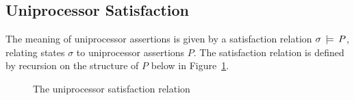 \documentclass[11pt]{report}
\begin{document}
\subsection{Uniprocessor Satisfaction}
\label{sec:uniprocessor-satisfaction}

The meaning of uniprocessor assertions is given by a satisfaction relation $\sigma \,\models\, P$, relating states $\sigma$ to uniprocessor assertions $P$. The satisfaction relation is defined by recursion on the structure of $P$ below in Figure~\ref{fig:uniprocessor-satisfaction-relation}. 

\begin{figure}[ht]
    \centering
    \resizebox{\columnwidth}{!}{
    \begin{minipage}{\columnwidth}
    \[
    \begin{array}{lllll}
        (s,h,b) & \sentails & b & \iffdef & \ext{s}(b) = 1 \\
        (s,h,b) & \sentails & {P \disj Q} & \iffdef & (s,h,b) \sentails{P} \disj (s,h,b) \sentails{Q} \\
        (s,h,b) & \sentails & {P \conj Q} & \iffdef & (s,h,b) \sentails{P} \conj (s,h,b) \sentails{Q} \\
        (s,h,b) & \sentails & {\exists x \st P} & \iffdef & \exists v \in \setvalues \st (\funup{s}{\ptup{x}{v}},h,b) \sentails{P} \\
        (s,h,b) & \sentails & {\forall x \st P} & \iffdef & \forall v \in \setvalues \st (\funup{s}{\ptup{x}{v}},h,b) \sentails{P} \\
        (s,h,b) & \sentails & {\femp} & \iffdef & h = \nil \conj b = \lnil \\
        (s,h,b) & \sentails & \fbaru & \iffdef & b = \lnil \\ 
        (s,h,b) & \sentails & {e \fwriteu e'} & \iffdef & ((h = \nil \conj b = \llit{(\ext{s}(e),\ext{s}(e''))}) \disj \\ 
        & & & & \,\;(h = \ext{s}(e) \mapsto \ext{s}(e') \conj b = \lnil)) \\
        (s,h,b) & \sentails & {P \fhash P'} & \iffdef & \exists \mu,\mu' \st \mu \fhash \mu' = (h,b) \conj \\ & & & & \;\;s,\mu \sentails{P} \conj s,\mu' \sentails{P'} \\
        (s,h,b) & \sentails & {P \fsep P'} & \iffdef & \exists \mu,\mu' \st \mu \fsep \mu' = (h,b) \conj \\ & & & & \;\;s,\mu \sentails{P} \conj s,\mu' \sentails{P'} \\
        (s,h,b) & \sentails & {P \fseq P'} & \iffdef & \exists \mu,\mu' \st \mu \fseq \mu' = (h,b) \conj \\ & & & & \;\;s,\mu \sentails{P} \conj s,\mu' \sentails{P'} 
    \end{array}
    \]
\end{minipage}}
    \caption{\label{fig:uniprocessor-satisfaction-relation} The uniprocessor satisfaction relation}
\end{figure}
\end{document}
